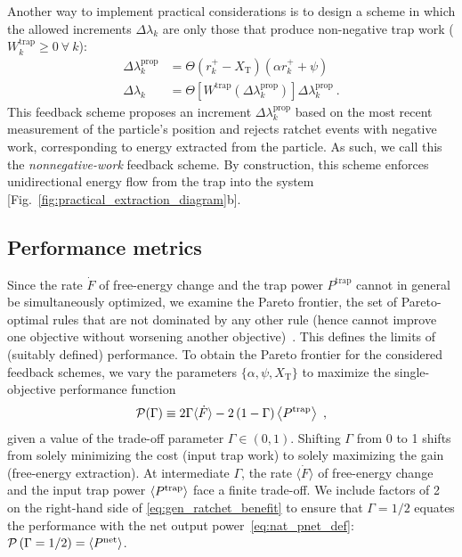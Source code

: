 \documentclass[%
reprint,
bibnotes, amsmath, amssymb, aps, pre,
 showkeys,
floatfix
]{revtex4-2}
\newcommand{\mrm}{\mathrm}
\newcommand{\mcal}{\mathcal}
\newcommand{\pr}[1]{\left(#1\right)} %
\newcommand{\sr}[1]{\left[#1\right]} %
\newcommand{\dlk}{\Delta\lambda_{k}}
\newcommand{\xkpr}{r_{k}^{+}}
\newcommand{\wt}{W^{\mrm{trap}}}
\newcommand{\pt}{P^{\mrm{trap}}}
\newcommand{\pg}{\dot{F}}
\newcommand{\ept}{\ev{P^{\mrm{trap}}}}
\newcommand{\epg}{\langle\dot{F}\rangle}
\newcommand{\epn}{\ev{P^{\mrm{net}}}}
\newcommand{\xT}{X_{\mrm{T}}}
\newcommand{\mP}{\mcal{P}}
\begin{document}
Another way to implement practical considerations is to design a scheme in which the allowed increments $\dlk$ are only those that produce non-negative trap work ($\wt_{k} \ge 0\ \forall\ k$):
\begin{subequations}\label{eq:strict_scheme}
    \begin{align}
        \dlk^{\mrm{prop}} &= \Theta\pr{\xkpr-\xT}\pr{\alpha\xkpr + \psi}\label{eq:strict_scheme1}\\
        \dlk &= \Theta\sr{\wt\pr{\dlk^{\mrm{prop}}}}\dlk^{\mrm{prop}} \ .\label{eq:strict_scheme2}
    \end{align}
\end{subequations}
This feedback scheme proposes an increment $\dlk^{\mrm{prop}}$ based on the most recent measurement of the particle's position and rejects ratchet events with negative work, corresponding to energy extracted from the particle.
As such, we call this the \emph{nonnegative-work} feedback scheme.
By construction, this scheme enforces unidirectional energy flow from the trap into the system [Fig.~\ref{fig:practical_extraction_diagram}b].


\subsection{Performance metrics}
\label{subsec:performance_metrics}

Since the rate $\pg$ of free-energy change and the trap power $\pt$ cannot in general be simultaneously optimized, we examine the Pareto frontier, the set of Pareto-optimal rules that are not dominated by any other rule (hence cannot improve one objective without worsening another objective)~\cite{Solon2018,Seoane2016}.
This defines the limits of (suitably defined) performance.
To obtain the Pareto frontier for the considered feedback schemes, we vary the parameters $\{\alpha, \psi, \xT\}$ to maximize the single-objective performance function
\begin{align}
    \mP(\Gamma) \equiv 2\Gamma\epg - 2\pr{1-\Gamma}\ept \ , \label{eq:gen_ratchet_benefit}
\end{align}
given a value of the trade-off parameter $\Gamma\in(0,1)$.
Shifting $\Gamma$ from 0 to 1 shifts from solely minimizing the cost (input trap work) to solely maximizing the gain (free-energy extraction).
At intermediate $\Gamma$, the rate $\epg$ of free-energy change and the input trap power $\ept$ face a finite trade-off. 
We include factors of 2 on the right-hand side of \eqref{eq:gen_ratchet_benefit} to ensure that $\Gamma=1/2$ equates the performance with the net output power~\eqref{eq:nat_pnet_def}: $\mP\pr{\Gamma=1/2} = \epn$.
\end{document}
